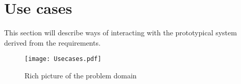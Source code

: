 \section{Use cases}\label{sec:usecases}

This section will describe ways of interacting with the prototypical system derived from the requirements.

\begin{figure}
 \centering 
 \texttt{[image: Usecases.pdf]}
 \caption{Rich picture of the problem domain}
\end{figure}
